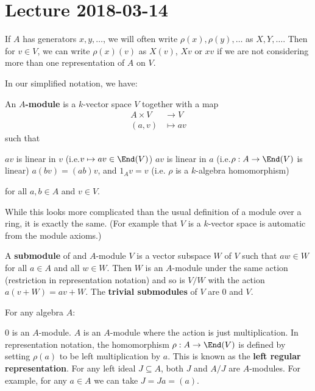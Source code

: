 \section{Lecture 2018-03-14}

\begin{note}
	If $A$ has generators $x,y,\ldots$, we will often write $\rho(x),\rho(y),\ldots$ as $X,Y,\ldots$.
	Then for $v \in V$, we can write $\rho(x)(v)$ as $X(v)$, $Xv$ or $xv$ if we are not considering more than one representation of $A$ on $V$.
\end{note}

In our simplified notation, we have:

\begin{defn}
	An \textbf{$A$-module} is a $k$-vector space $V$ together with a map
	\begin{align*}
		A \times V &\to V \\
		(a,v) &\mapsto av
	\end{align*}
	such that
	\begin{itm}
		\io $av$ is linear in $v$ (i.e.\@ $v \mapsto av \in \End(V)$)
		\io $av$ is linear in $a$ (i.e.\@ $\rho:A \to \End(V)$ is linear)
		\io $a(bv)=(ab)v$, and
		\io $1_Av=v$ (i.e. $\rho$ is a $k$-algebra homomorphism)
	\end{itm}
	for all $a,b \in A$ and $v \in V$.
\end{defn}

\begin{rmk}
	While this looks more complicated than the usual definition of a module over a ring, it is exactly the same. (For example that $V$ is a $k$-vector space is automatic from the module axioms.)
\end{rmk}

\begin{defn}
	A \textbf{submodule} of and $A$-module $V$ is a vector subspace $W$ of $V$ such that $aw \in W$ for all $a \in A$ and all $w \in W$.
	Then $W$ is an $A$-module under the same action (restriction in representation notation) and so is $V/W$ with the action $a(v+W)=av+W$.
	The \textbf{trivial submodules} of $V$ are $0$ and $V$.
\end{defn}

\begin{exam}
	For any algebra $A$:
	\begin{itm}
		\io $0$ is an $A$-module.
		\io $A$ is an $A$-module where the action is just multiplication.
		In representation notation, the homomorphism $\rho: A \to \End(V)$ is defined by setting $\rho(a)$ to be left multiplication by $a$.
		This is known as the \textbf{left regular representation}.
		\io For any left ideal $J \subseteq A$, both $J$ and $A/J$ are $A$-modules.
		For example, for any $a \in A$ we can take $J=Ja=(a)$.
	\end{itm}
\end{exam}

